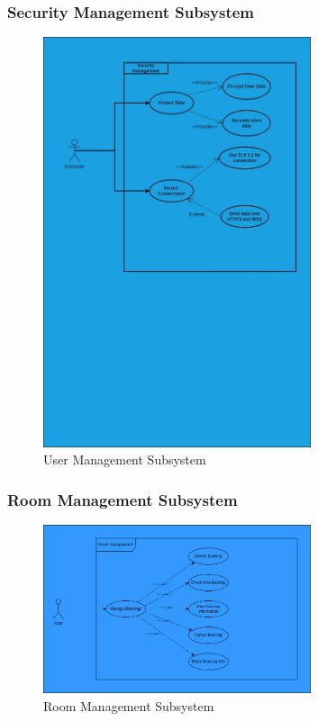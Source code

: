 \documentclass[11pt,a4paper]{article}
\begin{document}
\subsubsection*{Security Management Subsystem}
\begin{figure}[htbp]
    \centering
    \includegraphics[width=0.7\textwidth]{Security.jpg}
    \caption{User Management Subsystem}
\end{figure}
\pagebreak
\subsubsection*{Room Management Subsystem}
\begin{figure}[htbp]
    \centering
    \includegraphics[width=0.7\textwidth]{Room_Management.png}
    \caption{Room Management Subsystem}
\end{figure}
\pagebreak
\end{document}
